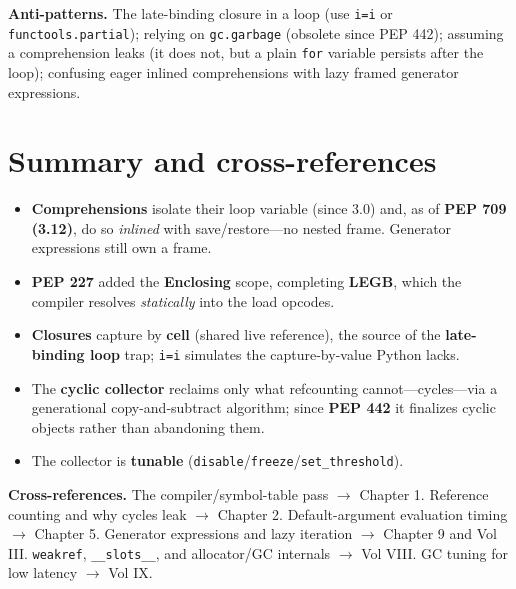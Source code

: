 \textbf{Anti-patterns.} The late-binding closure in a loop (use \texttt{i=i} or
\texttt{functools.partial}); relying on \texttt{gc.garbage} (obsolete since PEP 442); assuming
a comprehension leaks (it does not, but a plain \texttt{for} variable persists after the loop);
confusing eager inlined comprehensions with lazy framed generator expressions.

\section{Summary and cross-references}

\begin{itemize}
  \item \textbf{Comprehensions} isolate their loop variable (since 3.0) and, as of
    \textbf{PEP 709 (3.12)}, do so \emph{inlined} with save/restore---no nested frame.
    Generator expressions still own a frame.
  \item \textbf{PEP 227} added the \textbf{Enclosing} scope, completing \textbf{LEGB}, which
    the compiler resolves \emph{statically} into the load opcodes.
  \item \textbf{Closures} capture by \textbf{cell} (shared live reference), the source of the
    \textbf{late-binding loop} trap; \texttt{i=i} simulates the capture-by-value Python lacks.
  \item The \textbf{cyclic collector} reclaims only what refcounting cannot---cycles---via a
    generational copy-and-subtract algorithm; since \textbf{PEP 442} it finalizes cyclic
    objects rather than abandoning them.
  \item The collector is \textbf{tunable} (\texttt{disable}/\texttt{freeze}/\texttt{set\_threshold}).
\end{itemize}

\textbf{Cross-references.} The compiler/symbol-table pass $\rightarrow$ Chapter 1. Reference
counting and why cycles leak $\rightarrow$ Chapter 2. Default-argument evaluation timing
$\rightarrow$ Chapter 5. Generator expressions and lazy iteration $\rightarrow$ Chapter 9 and
Vol III. \texttt{weakref}, \texttt{\_\_slots\_\_}, and allocator/GC internals $\rightarrow$
Vol VIII. GC tuning for low latency $\rightarrow$ Vol IX.
